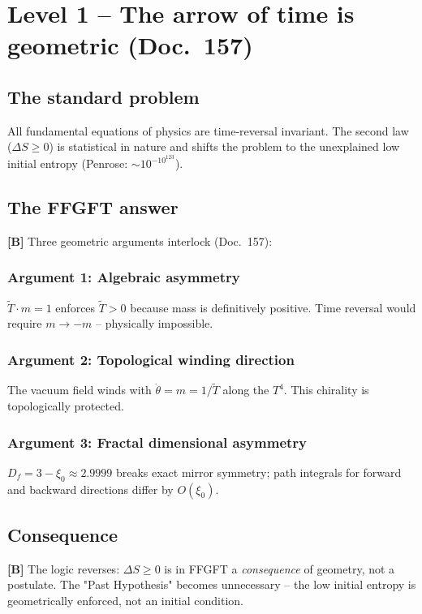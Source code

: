 \section{Level 1 -- The arrow of time is geometric (Doc.~157)}

\subsection{The standard problem}

All fundamental equations of physics are time-reversal invariant.
The second law ($\Delta S \ge 0$) is statistical in nature and
shifts the problem to the unexplained low initial entropy
(Penrose: $\sim 10^{-10^{123}}$).

\subsection{The FFGFT answer}

\textbf{[B]} Three geometric arguments interlock (Doc.~157):

\subsubsection{Argument 1: Algebraic asymmetry}
$\tilde{T} \cdot m = 1$ enforces $\tilde{T} > 0$ because mass is
definitively positive. Time reversal would require $m \to -m$ --
physically impossible.

\subsubsection{Argument 2: Topological winding direction}
The vacuum field winds with $\dot\theta = m = 1/\tilde{T}$
along the $T^4$. This chirality is topologically protected.

\subsubsection{Argument 3: Fractal dimensional asymmetry}
$D_f = 3 - \xi_0 \approx 2.9999$ breaks exact mirror symmetry;
path integrals for forward and backward directions differ by
$O(\xi_0)$.

\subsection{Consequence}

\textbf{[B]} The logic reverses: $\Delta S \ge 0$ is in FFGFT a
\emph{consequence} of geometry, not a postulate. The
"Past Hypothesis" becomes unnecessary -- the low initial entropy
is geometrically enforced, not an initial condition.

